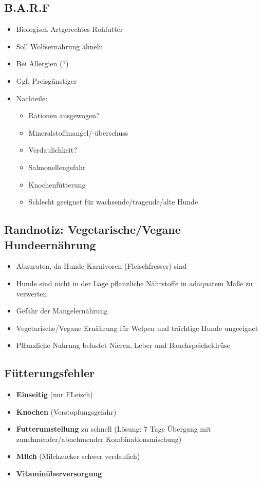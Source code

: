     \subsection{B.A.R.F}
        \begin{itemize}
            \item Biologisch Artgerechtes Rohfutter
            \item Soll Wolfsernährung ähneln
            \item Bei Allergien (?)
            \item Ggf. Preisgünstiger
            \item Nachteile:
            \begin{itemize}
                \item Rationen ausgewogen?
                \item Mineralstoffmangel/-überschuss
                \item Verdaulichkeit?
                \item Salmonellengefahr
                \item Knochenfütterung
                \item Schlecht geeignet für wachsende/tragende/alte Hunde
            \end{itemize}
        \end{itemize}

    \subsection{Randnotiz: Vegetarische/Vegane Hundeernährung}
        \begin{itemize}
            \item Abzuraten, da Hunde Karnivoren (Fleischfresser) sind
            \item Hunde sind nicht in der Lage pflanzliche Nährstoffe in adäquatem Maße zu verwerten
            \item Gefahr der Mangelernährung
            \item Vegetarische/Vegane Ernährung für Welpen und trächtige Hunde ungeeignet
            \item Pflanzliche Nahrung belastet Nieren, Leber und Bauchspeicheldrüse
        \end{itemize}

    \subsection{Fütterungsfehler}
        \begin{itemize}
            \item \textbf{Einseitig} (nur FLeisch)
            \item \textbf{Knochen} (Verstopfungsgefahr)
            \item \textbf{Futterumstellung} zu schnell (Lösung: 7 Tage Übergang mit zunehmender/abnehmender Kombinationsmischung)
            \item\textbf{Milch} (Milchzucker schwer verdaulich)
            \item \textbf{Vitaminüberversorgung}
        \end{itemize}

